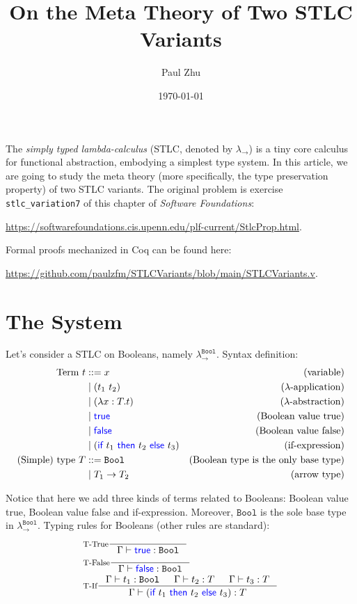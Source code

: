 \documentclass[11pt]{article}
\title{\textbf{On the Meta Theory of Two STLC Variants}}
\author{Paul Zhu}
\date{\today}
\let\t\texttt
\let\to\rightarrow
\newcommand{\Bool}{\t{Bool}}
\newcommand{\kword}[1]{{\color{blue} \textsf{#1}}}
\newcommand{\True}{\kword{true}}
\newcommand{\False}{\kword{false}}
\newcommand{\If}{\kword{if}}
\newcommand{\Then}{\kword{then}}
\newcommand{\Else}{\kword{else}}
\begin{document}
\maketitle

The \emph{simply typed lambda-calculus} (STLC, denoted by $\lambda_\to$) is a tiny core calculus for functional abstraction, embodying a simplest type system.
In this article, we are going to study the meta theory (more specifically, the type preservation property) of two STLC variants.
The original problem is exercise \t{stlc\_variation7} of this chapter of \emph{Software Foundations}:
\begin{center}
    \url{https://softwarefoundations.cis.upenn.edu/plf-current/StlcProp.html}.    
\end{center}
Formal proofs mechanized in Coq can be found here:
\begin{center}
    \url{https://github.com/paulzfm/STLCVariants/blob/main/STLCVariants.v}.
\end{center}

\section{The System}

Let's consider a STLC on Booleans, namely $\lambda_\to^{\Bool}$.
Syntax definition:
\begin{align*}
    \text{Term}~t &::= x & \text{(variable)} \\
    &\mid (t_1~t_2) & \text{($\lambda$-application)} \\
    &\mid (\lambda x:T.t) & \text{($\lambda$-abstraction)} \\
    &\mid \True & \text{(Boolean value true)} \\
    &\mid \False & \text{(Boolean value false)} \\
    &\mid (\If~t_1~\Then~t_2~\Else~t_3) & \text{(if-expression)} \\
    \text{(Simple) type}~T &::= \Bool & \text{(Boolean type is the only base type)} \\
    &\mid T_1\to T_2 & \text{(arrow type)}
\end{align*}

Notice that here we add three kinds of terms related to Booleans: Boolean value true, Boolean value false and if-expression.
Moreover, $\Bool$ is the sole base type in $\lambda_\to^{\Bool}$.
Typing rules for Booleans (other rules are standard):
\begin{align*}
    & \inference[T-True]{}{\Gamma \vdash \True:\Bool} \\
    & \inference[T-False]{}{\Gamma \vdash \False:\Bool} \\
    & \inference[T-If]{\Gamma \vdash t_1:\Bool & \Gamma \vdash t_2:T & \Gamma \vdash t_3:T}{\Gamma \vdash (\If~t_1~\Then~t_2~\Else~t_3):T}
\end{align*}
\end{document}
